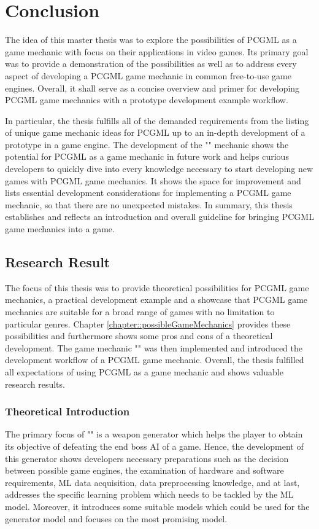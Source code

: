 \documentclass[MGS,Master,english]{twbook}%
\begin{document}
%
%
\clearpage
\chapter{Conclusion}
The idea of this master thesis was to explore the possibilities of \ac{PCGML} as a game mechanic with focus on their applications in video games. Its primary goal was to provide a demonstration of the possibilities as well as to address every aspect of developing a \ac{PCGML} game mechanic in common free-to-use game engines. Overall, it shall serve as a concise overview and primer for developing \ac{PCGML} game mechanics with a prototype development example workflow.

In particular, the thesis fulfills all of the demanded requirements from the listing of unique game mechanic ideas for \ac{PCGML} up to an in-depth development of a prototype in a game engine. The development of the "" mechanic shows the potential for \ac{PCGML} as a game mechanic in future work and helps curious developers to quickly dive into every knowledge necessary to start developing new games with \ac{PCGML} game mechanics. It shows the space for improvement and lists essential development considerations for implementing a \ac{PCGML} game mechanic, so that there are no unexpected mistakes. In summary, this thesis establishes and reflects an introduction and overall guideline for bringing \ac{PCGML} game mechanics into a game.

\section{Research Result}
The focus of this thesis was to provide theoretical possibilities for \ac{PCGML} game mechanics, a practical development example and a showcase that \ac{PCGML} game mechanics are suitable for a broad range of games with no limitation to particular genres. Chapter \ref{chapter::possibleGameMechanics} provides these possibilities and furthermore shows some pros and cons of a theoretical development. The game mechanic "" was then implemented and introduced the development workflow of a \ac{PCGML} game mechanic. Overall, the thesis fulfilled all expectations of using \ac{PCGML} as a game mechanic and shows valuable research results.

\subsection{Theoretical Introduction}
The primary focus of "" is a weapon generator which helps the player to obtain its objective of defeating the end boss \ac{AI} of a game. Hence, the development of this generator shows developers necessary preparations such as the decision between possible game engines, the examination of hardware and software requirements, \ac{ML} data acquisition, data preprocessing knowledge, and at last, addresses the specific learning problem which needs to be tackled by the \ac{ML} model. Moreover, it introduces some suitable models which could be used for the generator model and focuses on the most promising model.
\end{document}
